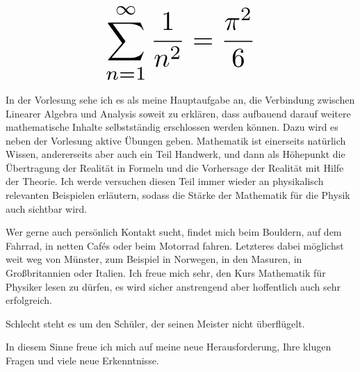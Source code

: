 \begin{multicols}{2}
\[
\resizebox{0.45\hsize}{!}{$\displaystyle\sum_{n = 1}^\infty \frac{1}{n^2} = \frac{\pi^2}{6}$}
\]

In der Vorlesung sehe ich es als meine Hauptaufgabe an, die Verbindung zwischen Linearer Algebra und Analysis soweit zu erklären, dass aufbauend darauf weitere mathematische Inhalte selbstständig erschlossen werden können. Dazu wird es neben der Vorlesung aktive Übungen geben. Mathematik ist einerseits natürlich Wissen, andererseits aber auch ein Teil Handwerk, und dann als Höhepunkt die Übertragung der Realität in Formeln und die Vorhersage der Realität mit Hilfe der Theorie. Ich werde versuchen diesen Teil immer wieder an physikalisch relevanten Beispielen erläutern, sodass die Stärke der Mathematik für die Physik auch sichtbar wird.

Wer gerne auch persönlich Kontakt sucht, findet mich beim Bouldern, auf dem Fahrrad, in netten Cafés oder beim Motorrad fahren. Letzteres dabei möglichst weit weg von Münster, zum Beispiel in Norwegen, in den Masuren, in Großbritannien oder Italien. Ich freue mich sehr, den Kurs Mathematik für Physiker lesen zu dürfen, es wird sicher anstrengend aber hoffentlich auch sehr erfolgreich.

Schlecht steht es um den Schüler, der seinen Meister nicht überflügelt.

In diesem Sinne freue ich mich auf meine neue Herausforderung, Ihre klugen Fragen und viele neue Erkenntnisse.

\end{multicols}
